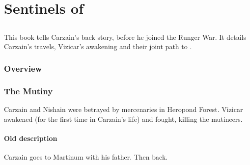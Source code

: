 
\part{Sentinels of \Miith}























\chapter{\CarzainPrequelBook}
This book tells Carzain's back story, before he joined the Runger War. 
It details Carzain's travels, Vizicar's awakening and their joint path to \kenosis. 















\section{Overview}















\section{The Mutiny}
Carzain and Nishain were betrayed by mercenaries in Heropond Forest. 
Vizicar awakened (for the first time in Carzain's life) and fought, killing the mutineers. 









\subsection{Old description}
Carzain goes to Martinum with his father. Then back.

